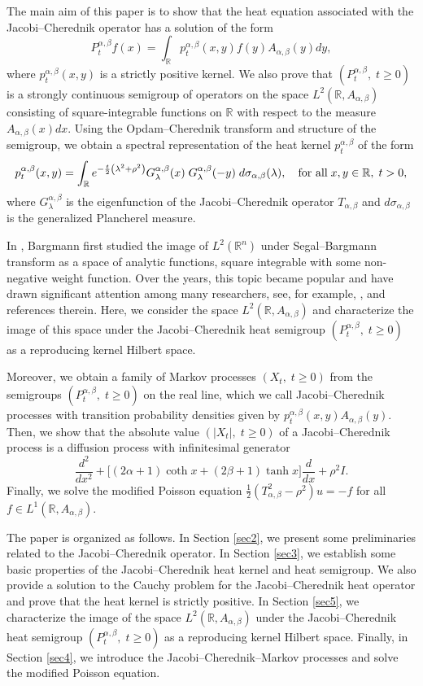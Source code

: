 \documentclass[a4paper,11pt, reqno]{amsart}
\theoremstyle{plain}
\theoremstyle{definition}
\theoremstyle{remark}
\def \R{{\mathbb R}}
\def\R{\mathbb R}
\begin{document}
The main aim of this paper is to show that the heat equation associated with the Jacobi--Cherednik operator has a solution of the form
\[ P^{\alpha, \beta}_t f(x)= \int_{\R} p^{\alpha, \beta}_t(x, y) f(y) A_{\alpha, \beta} (y)dy, \]
where $p^{\alpha, \beta}_t(x, y)$ is a strictly positive kernel. We also prove that $\left(P^{\alpha, \beta}_t, \;t \geq 0\right)$ is a strongly continuous semigroup of operators on the space $L^2(\R, A_{\alpha, \beta})$ consisting of square-integrable functions on $\R$ with respect to the measure $A_{\alpha, \beta}(x) dx$. Using the Opdam--Cherednik transform and structure of the semigroup, we obtain a spectral representation of the heat kernel $p^{\alpha, \beta}_t$ of the form
\[ p_t^{\alpha, \beta}(x, y)= \int_{\mathbb{R}} e^{-\frac{t}{2}\left( \lambda^2+\rho^2\right)}  G^{\alpha, \beta}_\lambda(x)\;  G^{\alpha, \beta}_\lambda(-y) \; d\sigma_{\alpha, \beta}(\lambda), \quad \text{for  all\;} x,y \in \R, \; t>0, \]
where $G^{\alpha, \beta}_\lambda$ is the eigenfunction of the Jacobi--Cherednik operator $T_{\alpha, \beta}$ and $d\sigma_{\alpha, \beta}$ is the generalized Plancherel measure. 

In \cite{bar61}, Bargmann first studied the image of $L^2(\R^n)$ under Segal--Bargmann transform as a space of analytic functions, square integrable with some non-negative weight function. Over the years, this topic became popular and have drawn significant attention among many researchers, see, for example, \cite{hal04, tha07, rad09}, and references therein. Here, we consider the space $L^2(\R, A_{\alpha, \beta})$ and characterize the image of this space under the Jacobi--Cherednik heat semigroup $\left(P^{\alpha, \beta}_t, \;t \geq 0 \right)$ as a reproducing kernel Hilbert space.

Moreover, we obtain a family of Markov processes $\left( X_t, \;t \geq 0\right)$ from the semigroups $\left(P^{\alpha, \beta}_t, \;t \geq 0\right)$ on the real line, which we call Jacobi--Cherednik processes with transition probability densities given by $ p^{\alpha, \beta}_t(x, y) A_{\alpha, \beta} (y) $. Then, we show that the absolute value $\left( |X_t| , \;t \geq 0\right)$ of a Jacobi--Cherednik process is a diffusion process with infinitesimal generator 
\[ \frac{d^2}{dx^2} + \Big[ (2\alpha + 1) \coth x + (2\beta + 1) \tanh x \Big] \frac{d}{dx} + \rho^2 I. \]
Finally, we solve the modified Poisson equation $\frac{1}{2}\left(T^2_{\alpha, \beta} - \rho^2 \right) u=-f$ for all $f \in L^1(\R, A_{\alpha, \beta})$.

The paper is organized as follows. In Section \ref{sec2}, we present some preliminaries related to the Jacobi--Cherednik operator. In Section \ref{sec3}, we establish some basic properties of the Jacobi--Cherednik heat kernel and heat semigroup. We also provide a solution to the Cauchy problem for the Jacobi--Cherednik heat operator and prove that the heat kernel is strictly positive. In Section \ref{sec5}, we characterize the image of the space $L^2(\R, A_{\alpha, \beta})$ under the Jacobi--Cherednik heat semigroup $\left(P^{\alpha, \beta}_t, \;t \geq 0 \right)$ as a reproducing kernel Hilbert space. Finally, in Section \ref{sec4}, we introduce the Jacobi--Cherednik--Markov processes and solve the modified Poisson equation.
\end{document}
